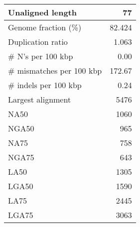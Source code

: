 \documentclass[12pt,a4paper]{article}
\begin{document}
\begin{table}[ht]
\begin{center}
\begin{tabular}{|l*{1}{|r}|}
Unaligned length & 77 \\ \hline
Genome fraction (\%) & 82.424 \\ \hline
Duplication ratio & 1.063 \\ \hline
\# N's per 100 kbp & 0.00 \\ \hline
\# mismatches per 100 kbp & 172.67 \\ \hline
\# indels per 100 kbp & 0.24 \\ \hline
Largest alignment & 5476 \\ \hline
NA50 & 1060 \\ \hline
NGA50 & 965 \\ \hline
NA75 & 758 \\ \hline
NGA75 & 643 \\ \hline
LA50 & 1305 \\ \hline
LGA50 & 1590 \\ \hline
LA75 & 2445 \\ \hline
LGA75 & 3063 \\ \hline
\end{tabular}
\end{center}
\end{table}
\end{document}
